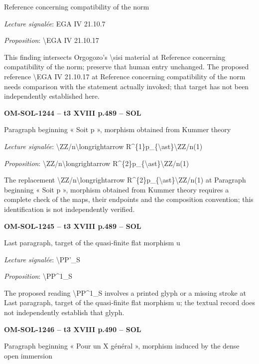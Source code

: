 Reference concerning compatibility of the norm\par
\emph{Lecture signalée}: EGA IV 21.10.7\par
\emph{Proposition}: \textbackslash{}EGA IV 21.10.17\par
This finding intersects Orgogozo's \textbackslash{}sisi material at Reference concerning compatibility of the norm; preserve that human entry unchanged. The proposed reference \textbackslash{}EGA IV 21.10.17 at Reference concerning compatibility of the norm needs comparison with the statement actually invoked; that target has not been independently established here.\par
\par\noindent\textbf{OM-SOL-1244 -- t3 XVIII p.489 -- SOL}\par
Paragraph beginning « Soit p », morphism obtained from Kummer theory\par
\emph{Lecture signalée}: \textbackslash{}ZZ/n\textbackslash{}longrightarrow R\textasciicircum{}\{1\}p\_\{\textbackslash{}ast\}\textbackslash{}ZZ/n(1)\par
\emph{Proposition}: \textbackslash{}ZZ/n\textbackslash{}longrightarrow R\textasciicircum{}\{2\}p\_\{\textbackslash{}ast\}\textbackslash{}ZZ/n(1)\par
The replacement \textbackslash{}ZZ/n\textbackslash{}longrightarrow R\textasciicircum{}\{2\}p\_\{\textbackslash{}ast\}\textbackslash{}ZZ/n(1) at Paragraph beginning « Soit p », morphism obtained from Kummer theory requires a complete check of the maps, their endpoints and the composition convention; this identification is not independently verified.\par
\par\noindent\textbf{OM-SOL-1245 -- t3 XVIII p.489 -- SOL}\par
Last paragraph, target of the quasi-finite flat morphism u\par
\emph{Lecture signalée}: \textbackslash{}PP'\_S\par
\emph{Proposition}: \textbackslash{}PP\textasciicircum{}1\_S\par
The proposed reading \textbackslash{}PP\textasciicircum{}1\_S involves a printed glyph or a missing stroke at Last paragraph, target of the quasi-finite flat morphism u; the textual record does not independently establish that glyph.\par
\par\noindent\textbf{OM-SOL-1246 -- t3 XVIII p.490 -- SOL}\par
Paragraph beginning « Pour un X général », morphism induced by the dense open immersion\par
